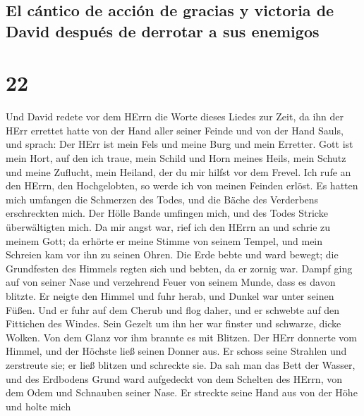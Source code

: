 \hypertarget{el-cuxe1ntico-de-acciuxf3n-de-gracias-y-victoria-de-david-despuuxe9s-de-derrotar-a-sus-enemigos}{%
\subsection{El cántico de acción de gracias y victoria de David después
de derrotar a sus
enemigos}\label{el-cuxe1ntico-de-acciuxf3n-de-gracias-y-victoria-de-david-despuuxe9s-de-derrotar-a-sus-enemigos}}

\hypertarget{section-21}{%
\section{22}\label{section-21}}

 Und David redete vor dem HErrn die Worte dieses Liedes
zur Zeit, da ihn der HErr errettet hatte von der Hand aller seiner
Feinde und von der Hand Sauls, und sprach:  Der HErr ist
mein Fels und meine Burg und mein Erretter.  Gott ist mein
Hort, auf den ich traue, mein Schild und Horn meines Heils, mein Schutz
und meine Zuflucht, mein Heiland, der du mir hilfst vor dem Frevel.
 Ich rufe an den HErrn, den Hochgelobten, so werde ich von
meinen Feinden erlöst.  Es hatten mich umfangen die
Schmerzen des Todes, und die Bäche des Verderbens erschreckten mich.
 Der Hölle Bande umfingen mich, und des Todes Stricke
überwältigten mich.  Da mir angst war, rief ich den HErrn
an und schrie zu meinem Gott; da erhörte er meine Stimme von seinem
Tempel, und mein Schreien kam vor ihn zu seinen Ohren. 
Die Erde bebte und ward bewegt; die Grundfesten des Himmels regten sich
und bebten, da er zornig war.  Dampf ging auf von seiner
Nase und verzehrend Feuer von seinem Munde, dass es davon blitzte.
 Er neigte den Himmel und fuhr herab, und Dunkel war
unter seinen Füßen.  Und er fuhr auf dem Cherub und flog
daher, und er schwebte auf den Fittichen des Windes. 
Sein Gezelt um ihn her war finster und schwarze, dicke Wolken.
 Von dem Glanz vor ihm brannte es mit Blitzen.
 Der HErr donnerte vom Himmel, und der Höchste ließ
seinen Donner aus.  Er schoss seine Strahlen und
zerstreute sie; er ließ blitzen und schreckte sie.  Da
sah man das Bett der Wasser, und des Erdbodens Grund ward aufgedeckt von
dem Schelten des HErrn, von dem Odem und Schnauben seiner Nase.
 Er streckte seine Hand aus von der Höhe und holte mich
